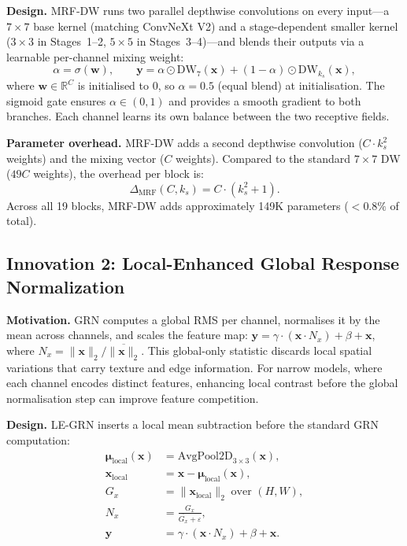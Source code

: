 \documentclass{article}
\begin{document}
\textbf{Design.}  MRF-DW runs two parallel depthwise convolutions on
every input---a $7\times7$ base kernel (matching ConvNeXt V2) and a
stage-dependent smaller kernel ($3\times3$ in Stages~1--2,
$5\times5$ in Stages~3--4)---and blends their outputs via a learnable
per-channel mixing weight:
\begin{equation}
  \alpha = \sigma(\mathbf{w}), \qquad
  \mathbf{y} = \alpha \odot \text{DW}_{7}(\mathbf{x})
    + (1 - \alpha) \odot \text{DW}_{k_s}(\mathbf{x}),
\label{eq:mrf}
\end{equation}
where $\mathbf{w} \in \mathbb{R}^C$ is initialised to 0, so
$\alpha = 0.5$ (equal blend) at initialisation.  The sigmoid gate
ensures $\alpha \in (0,1)$ and provides a smooth gradient to both
branches.  Each channel learns its own balance between the two
receptive fields.

\textbf{Parameter overhead.}  MRF-DW adds a second depthwise
convolution ($C \cdot k_s^2$ weights) and the mixing vector ($C$
weights).  Compared to the standard $7\times7$ DW ($49C$ weights), the
overhead per block is:
\begin{equation}
  \Delta_{\text{MRF}}(C, k_s) = C \cdot (k_s^2 + 1).
  \label{eq:mrf_overhead}
\end{equation}
Across all 19 blocks, MRF-DW adds approximately 149K parameters
($<0.8\%$ of total).

\subsection{Innovation 2: Local-Enhanced Global Response Normalization}

\textbf{Motivation.}  GRN computes a global RMS per channel,
normalises it by the mean across channels, and scales the feature map:
$\mathbf{y} = \gamma \cdot (\mathbf{x} \cdot N_x) + \beta + \mathbf{x}$,
where $N_x = \|\mathbf{x}\|_2 / \overline{\|\mathbf{x}\|_2}$.
This global-only statistic discards local spatial variations that carry
texture and edge information.  For narrow models, where each channel
encodes distinct features, enhancing local contrast before the global
normalisation step can improve feature competition.

\textbf{Design.}  LE-GRN inserts a local mean subtraction before the
standard GRN computation:
\begin{align}
  \boldsymbol{\mu}_{\text{local}}(\mathbf{x})
    &= \text{AvgPool2D}_{3\times3}(\mathbf{x}), \label{eq:legrn_local}\\
  \mathbf{x}_{\text{local}}
    &= \mathbf{x} - \boldsymbol{\mu}_{\text{local}}(\mathbf{x}),
      \label{eq:legrn_sub}\\
  G_x &= \|\mathbf{x}_{\text{local}}\|_2 \; \text{over } (H, W),
      \label{eq:legrn_rms}\\
  N_x &= \frac{G_x}{\overline{G_x} + \varepsilon},
      \label{eq:legrn_norm}\\
  \mathbf{y} &= \gamma \cdot (\mathbf{x} \cdot N_x)
    + \beta + \mathbf{x}. \label{eq:legrn_out}
\end{align}
\end{document}
